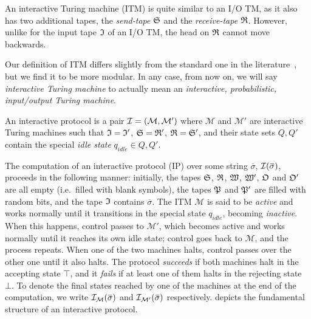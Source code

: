 An interactive Turing machine (ITM) is quite similar to an I/O TM, as it also has two additional 
tapes, the \emph{send-tape} \(\mathfrak{S} \) and the \emph{receive-tape} \(\mathfrak{R} \).
However, unlike for the input tape \(\mathfrak{I} \) of an I/O TM, the head on \(\mathfrak{R} \) cannot move 
backwards.
\begin{remark}  
  Our definition of ITM differs slightly from the standard one in the 
  literature~\cite{GoldreichMW1991,GoldwasserMR1989}, but we find it to be more modular.
  In any case, from now on, we will say \emph{interactive Turing machine} to actually mean an 
 \emph{interactive, probabilistic, input/output Turing machine}.
\end{remark}

\begin{definition}
  An interactive protocol is a pair \(\mathcal{I} = \left(\mathcal{M}, \mathcal{M'}\right)\)
  where \(\mathcal{M}\) and \(\mathcal{M'}\) are interactive Turing machines such that 
  \(\mathfrak{I} = \mathfrak{I}'\), \(\mathfrak{S} = \mathfrak{R}' \), \(\mathfrak{R} = \mathfrak{S}'\), and their 
  state sets \(Q, Q'\) contain the special \emph{idle state} \(q_{idle} \in Q, Q'\).
\end{definition}

The computation of an interactive protocol (IP) over some string \(\overbar{\sigma}\), 
\(\call{\mathcal{I}}{\overbar{\sigma}}\), proceeds in the following manner: 
initially, the tapes \(\mathfrak{S} \), \(\mathfrak{R} \), \(\mathfrak{W} \), \(\mathfrak{W}' \), \(\mathfrak{O} \) 
and \(\mathfrak{O}' \) are all empty (i.e.\ filled with blank symbols), the tapes \(\mathfrak{P} \) and 
\(\mathfrak{P}' \) are filled with random bits, and the tape \(\mathfrak{I} \) contains \(\overbar{\sigma}\).
The ITM \(\mathcal{M}\) is said to be \emph{active} and works normally until it transitions in the 
special state \(q_{idle}\), becoming \emph{inactive}.
When this happens, control passes to \(\mathcal{M}'\), which becomes active and works normally 
until it reaches its own idle state; control goes back to \(\mathcal{M}\), and the process repeats.
When one of the two machines halts, control passes over the other one until it also halts.
The protocol \emph{succeeds} if both machines halt in the accepting state \(\top \), and it 
\emph{fails} if at least one of them halts in the rejecting state \(\bot \).
To denote the final states reached by one of the machines at the end of the computation, 
we write \(\call{\mathcal{I}_{\mathcal{M}}}{\overbar{\sigma}}\) and 
\(\call{\mathcal{I}_{\mathcal{M}'}}{\overbar{\sigma}}\) respectively.
 depicts the fundamental structure of an interactive protocol.

